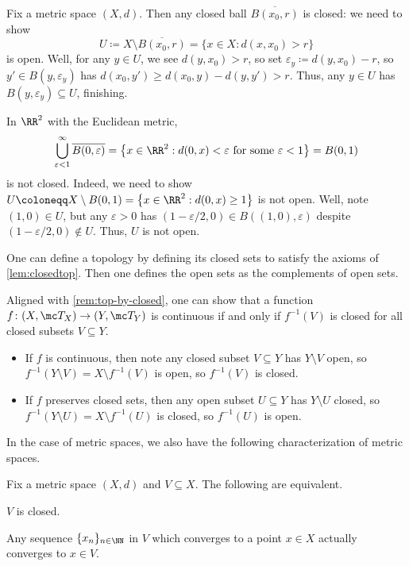 \documentclass[../notes.tex]{subfiles}
\begin{document}
\begin{example}
	Fix a metric space $(X,d)$. Then any closed ball $\overline{B(x_0,r)}$ is closed: we need to show
	\[U\coloneqq X\setminus\overline{B(x_0,r)}=\{x\in X:d(x,x_0)>r\}\]
	is open. Well, for any $y\in U$, we see $d(y,x_0)>r$, so set $\varepsilon_y\coloneqq d(y,x_0)-r$, so $y'\in B(y,\varepsilon_y)$ has $d(x_0,y')\ge d(x_0,y)-d(y,y')>r$. Thus, any $y\in U$ has $B(y,\varepsilon_y)\subseteq U$, finishing.
\end{example}
\begin{remark}
	In $\RR^2$ with the Euclidean metric,
	\[\bigcup_{\varepsilon<1}^\infty\overline{B(0,\varepsilon)}=\left\{x\in\RR^2:d(0,x)<\varepsilon\text{ for some }\varepsilon<1\right\}=B(0,1)\]
	is not closed. Indeed, we need to show $U\coloneqq X\setminus B(0,1)=\left\{x\in\RR^2:d(0,x)\ge1\right\}$ is not open. Well, note $(1,0)\in U$, but any $\varepsilon>0$ has $(1-\varepsilon/2,0)\in B((1,0),\varepsilon)$ despite $(1-\varepsilon/2,0)\notin U$. Thus, $U$ is not open.
\end{remark}
\begin{remark} \label{rem:top-by-closed}
	One can define a topology by defining its closed sets to satisfy the axioms of \autoref{lem:closedtop}. Then one defines the open sets as the complements of open sets.
\end{remark}
\begin{remark} \label{rem:cont-by-closed}
	Aligned with \autoref{rem:top-by-closed}, one can show that a function $f\colon(X,\mc T_X)\to(Y,\mc T_Y)$ is continuous if and only if $f^{-1}(V)$ is closed for all closed subsets $V\subseteq Y$.
	\begin{itemize}
		\item If $f$ is continuous, then note any closed subset $V\subseteq Y$ has $Y\setminus V$ open, so $f^{-1}(Y\setminus V)=X\setminus f^{-1}(V)$ is open, so $f^{-1}(V)$ is closed.
		\item If $f$ preserves closed sets, then any open subset $U\subseteq Y$ has $Y\setminus U$ closed, so $f^{-1}(Y\setminus U)=X\setminus f^{-1}(U)$ is closed, so $f^{-1}(U)$ is open.
	\end{itemize}
\end{remark}
In the case of metric spaces, we also have the following characterization of metric spaces.
\begin{lemma} \label{lem:metricclosed}
	Fix a metric space $(X,d)$ and $V\subseteq X$. The following are equivalent.
	\begin{listalph}
		\item $V$ is closed.
		\item Any sequence $\{x_n\}_{n\in\NN}$ in $V$ which converges to a point $x\in X$ actually converges to $x\in V$.
	\end{listalph}
\end{lemma}
\end{document}
